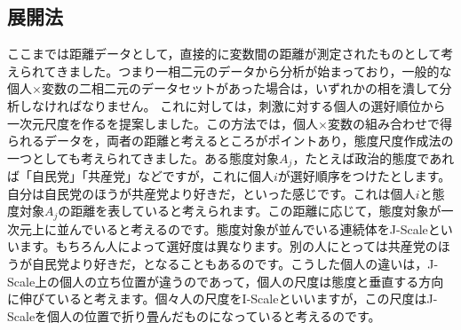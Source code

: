 \documentclass{ltjsbook}
\begin{document}
\subsection{展開法}
ここまでは距離データとして，直接的に変数間の距離が測定されたものとして考えられてきました。つまり一相二元のデータから分析が始まっており，一般的な個人$\times$変数の二相二元のデータセットがあった場合は，いずれかの相を潰して分析しなければなりません。
これに対して\textcite{coombs1950psychological}は，刺激に対する個人の選好順位から一次元尺度を作るを提案しました。この方法では，個人$\times$変数の組み合わせで得られるデータを，両者の距離と考えるところがポイントあり，態度尺度作成法の一つとしても考えられてきました\parencite{Fujihara2001}。ある態度対象$A_j$，たとえば政治的態度であれば「自民党」「共産党」などですが，これに個人$i$が選好順序をつけたとします。自分は自民党のほうが共産党より好きだ，といった感じです。これは個人$i$と態度対象$A_j$の距離を表していると考えられます。この距離に応じて，態度対象が一次元上に並んでいると考えるのです。態度対象が並んでいる連続体をJ-Scaleといいます。もちろん人によって選好度は異なります。別の人にとっては共産党のほうが自民党より好きだ，となることもあるのです。こうした個人の違いは，J-Scale上の個人の立ち位置が違うのであって，個人の尺度は態度と垂直する方向に伸びていると考えます。個々人の尺度をI-Scaleといいますが，この尺度はJ-Scaleを個人の位置で折り畳んだものになっていると考えるのです。
\end{document}
